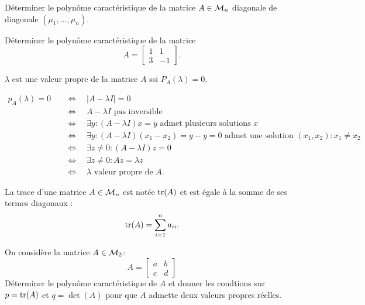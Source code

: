 \begin{exercise*}
  Déterminer le polynôme caractéristique de la matrice $A \in \mathcal{M}_n$ diagonale de diagonale $(\mu_1, \dots, \mu_n)$.
\end{exercise*}


\begin{exercise*}
  Déterminer le polynôme caractéristique de la matrice
  $$
  A = \left[\begin{array}{rr} 1 & 1 \\ 3 & -1 \end{array}\right].
  $$
\end{exercise*}



\begin{theorem*}
  $\lambda$ est une valeur propre de la matrice $A$ ssi $P_A(\lambda) = 0$.
\end{theorem*}

\proof
  \begin{align*}
    p_A(\lambda) = 0 
    & \quad \Leftrightarrow \quad |A - \lambda I| = 0 \\
    & \quad \Leftrightarrow \quad A - \lambda I \text{ pas inversible} \\
    & \quad \Leftrightarrow \quad \exists y: (A - \lambda I)x = y \text{ admet plusieurs solutions $x$} \\
    & \quad \Leftrightarrow \quad \exists y: (A - \lambda I)(x_1 - x_2) = y-y = 0 \text{ admet une solution $(x_1, x_2): x_1 \neq x_2$} \\
    & \quad \Leftrightarrow \quad \exists z \neq 0: (A - \lambda I)z = 0 \\
    & \quad \Leftrightarrow \quad \exists z \neq 0: A z = \lambda z \\
    & \quad \Leftrightarrow \quad \lambda \text{ valeur propre de } A. 
  \end{align*} 
\eproof

\begin{definition*}[Trace]
  La trace d'une matrice $A \in \mathcal{M}_n$ est notée $\operatorname{tr}(A)$ et est égale à la somme de ses termes diagonaux :
  $$
  \operatorname{tr}(A) = \sum_{i=1}^n a_{ii}.
  $$
\end{definition*}


\begin{exercise*}
  On considère la matrice $A \in \mathcal{M}_2$:
  $$
  A = \left[\begin{array}{cc} a & b \\ c & d\end{array}\right]
  $$
  Déterminer le polynôme caractéristique de $A$ et donner les condtions sur $p = \operatorname{tr}(A)$ et $q = \det(A)$ pour que $A$ admette deux valeurs propres réelles.
\end{exercise*}

